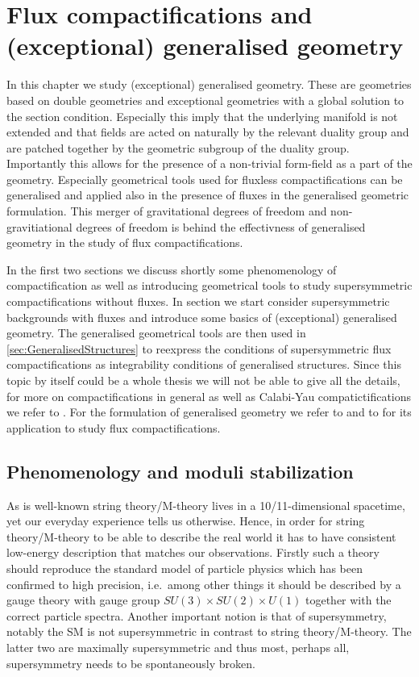 \chapter{Flux compactifications and (exceptional) generalised
geometry\label{chap:FluxCompactifications}}

In this chapter we study (exceptional) generalised geometry. These are geometries based on double geometries and exceptional geometries with a global solution to the section condition. Especially this imply that the underlying manifold is not extended and that fields are acted on naturally by the relevant duality group and are patched together by the geometric subgroup of the duality group. Importantly this allows for the presence of a non-trivial form-field as a part of the geometry. Especially geometrical tools used for fluxless compactifications can be generalised and applied also in the presence of fluxes in the generalised geometric formulation. This merger of gravitational degrees of freedom and non-gravitiational degrees of freedom is behind the effectivness of generalised geometry in the study of flux compactifications. 

In the first two sections we discuss shortly some phenomenology of compactification as well as introducing geometrical tools to study supersymmetric compactifications without fluxes. In section we start consider supersymmetric backgrounds with fluxes and introduce some basics of (exceptional) generalised geometry. The generalised geometrical tools are then used in \ref{sec:GeneralisedStructures} to reexpress the conditions of supersymmetric flux compactifications as integrability conditions of generalised structures. Since this topic by itself could be a whole thesis we will not be able to give all the details, for more on compactifications in general as well as Calabi-Yau compatictifications we refer to \cite{Blumenhagen2013,Grana:2005jc}. For the formulation of generalised geometry we refer to \cite{Hull:2007zu,Coimbra:2011ky,Coimbra:2011nw} and to \cite{Ashmore:2015joa,Grana:2009im} for its application to study flux compactifications. 

\section{Phenomenology and moduli stabilization}
As is well-known string theory/M-theory lives in a 10/11-dimensional spacetime, yet our everyday experience tells us otherwise. Hence, in order for string theory/M-theory to be able to describe the real world it has to have consistent low-energy description that matches our observations. Firstly such a theory should reproduce the standard model of particle physics which has been confirmed to high precision, i.e.\ among other things it should be described by a gauge theory with gauge group $SU(3)\times SU(2)\times U(1)$ together with the correct particle spectra. Another important notion is that of supersymmetry, notably the SM is not supersymmetric in contrast to string theory/M-theory. The latter two are maximally supersymmetric and thus most, perhaps all, supersymmetry needs to be spontaneously broken. %

